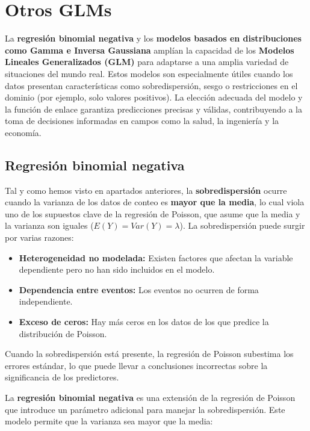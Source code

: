 \documentclass[
  letterpaper,
  DIV=11,
  numbers=noendperiod]{scrreprt}
\providecommand{\tightlist}{%
  \setlength{\itemsep}{0pt}\setlength{\parskip}{0pt}}
\begin{document}
\section{Otros GLMs}\label{otros-glms}

La \textbf{regresión binomial negativa} y los \textbf{modelos basados en
distribuciones como Gamma e Inversa Gaussiana} amplían la capacidad de
los \textbf{Modelos Lineales Generalizados (GLM)} para adaptarse a una
amplia variedad de situaciones del mundo real. Estos modelos son
especialmente útiles cuando los datos presentan características como
sobredispersión, sesgo o restricciones en el dominio (por ejemplo, solo
valores positivos). La elección adecuada del modelo y la función de
enlace garantiza predicciones precisas y válidas, contribuyendo a la
toma de decisiones informadas en campos como la salud, la ingeniería y
la economía.

\subsection{Regresión binomial
negativa}\label{regresiuxf3n-binomial-negativa}

Tal y como hemos visto en apartados anteriores, la
\textbf{sobredispersión} ocurre cuando la varianza de los datos de
conteo es \textbf{mayor que la media}, lo cual viola uno de los
supuestos clave de la regresión de Poisson, que asume que la media y la
varianza son iguales (\(E(Y) = Var(Y) = \lambda\)). La sobredispersión
puede surgir por varias razones:

\begin{itemize}
\tightlist
\item
  \textbf{Heterogeneidad no modelada:} Existen factores que afectan la
  variable dependiente pero no han sido incluidos en el modelo.
\item
  \textbf{Dependencia entre eventos:} Los eventos no ocurren de forma
  independiente.
\item
  \textbf{Exceso de ceros:} Hay más ceros en los datos de los que
  predice la distribución de Poisson.
\end{itemize}

Cuando la sobredispersión está presente, la regresión de Poisson
subestima los errores estándar, lo que puede llevar a conclusiones
incorrectas sobre la significancia de los predictores.

La \textbf{regresión binomial negativa} es una extensión de la regresión
de Poisson que introduce un parámetro adicional para manejar la
sobredispersión. Este modelo permite que la varianza sea mayor que la
media:
\end{document}
